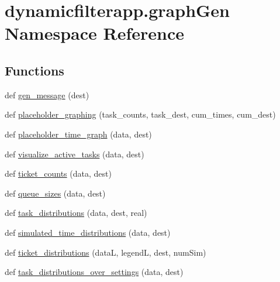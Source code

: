 \hypertarget{namespacedynamicfilterapp_1_1graph_gen}{}\section{dynamicfilterapp.\+graph\+Gen Namespace Reference}
\label{namespacedynamicfilterapp_1_1graph_gen}
\subsection*{Functions}
\begin{DoxyCompactItemize}
\item 
def \mbox{\hyperlink{namespacedynamicfilterapp_1_1graph_gen_a64d150f32e0559d2ca96e9a2db637fd4}{gen\+\_\+message}} (dest)
\item 
def \mbox{\hyperlink{namespacedynamicfilterapp_1_1graph_gen_aa390916522804b2486fb15d5af94c93a}{placeholder\+\_\+graphing}} (task\+\_\+counts, task\+\_\+dest, cum\+\_\+times, cum\+\_\+dest)
\item 
def \mbox{\hyperlink{namespacedynamicfilterapp_1_1graph_gen_a96ba3683ba7bda319710d14f7a3e923d}{placeholder\+\_\+time\+\_\+graph}} (data, dest)
\item 
def \mbox{\hyperlink{namespacedynamicfilterapp_1_1graph_gen_a6cbfcba30770fe88d3861ce90330a3a9}{visualize\+\_\+active\+\_\+tasks}} (data, dest)
\item 
def \mbox{\hyperlink{namespacedynamicfilterapp_1_1graph_gen_ade6ccfe6b14b9f3fa663d9f6cd2898b4}{ticket\+\_\+counts}} (data, dest)
\item 
def \mbox{\hyperlink{namespacedynamicfilterapp_1_1graph_gen_a209f6a234ddb6528b7c7df731a0bd5ed}{queue\+\_\+sizes}} (data, dest)
\item 
def \mbox{\hyperlink{namespacedynamicfilterapp_1_1graph_gen_afba42249a248ae8c7af2cfaea3b37c6c}{task\+\_\+distributions}} (data, dest, real)
\item 
def \mbox{\hyperlink{namespacedynamicfilterapp_1_1graph_gen_a50af14aa0304c1716efb3f629e2655b4}{simulated\+\_\+time\+\_\+distributions}} (data, dest)
\item 
def \mbox{\hyperlink{namespacedynamicfilterapp_1_1graph_gen_a5b53dfee6e695f00b609c9f39978803b}{ticket\+\_\+distributions}} (dataL, legendL, dest, num\+Sim)
\item 
def \mbox{\hyperlink{namespacedynamicfilterapp_1_1graph_gen_aec5e69baf371fabab25fac24c7df5d15}{task\+\_\+distributions\+\_\+over\+\_\+settings}} (data, dest)
\item 

\end{DoxyCompactItemize}
